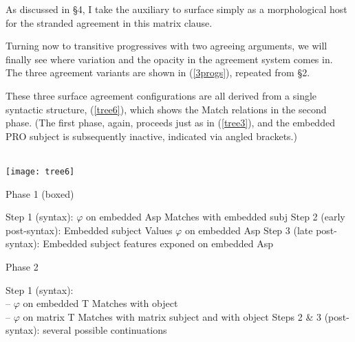 \documentclass[output=paper
,modfonts
,nonflat]{langsci/langscibook}
\begin{document}
\noindent As discussed in \S4, I take the auxiliary to surface simply as a morphological host for the stranded agreement in this matrix clause. 

Turning now to transitive progressives with two agreeing arguments, we will finally see where variation and the opacity in the agreement system comes in. The three agreement variants are shown in (\ref{3progs}), repeated from \S2. 

\eal \label{3progs}
\zl

These three surface agreement configurations are all derived from a single syntactic structure, (\ref{tree6}), which shows the Match relations in the second phase. (The first phase, again, proceeds just as in (\ref{tree3}), and the embedded PRO subject is subsequently inactive, indicated via angled brackets.) 

\ea \label{tree6} \- \\ \texttt{[image: tree6]}
\z

\eal \label{layoutincomp}
\ex Phase 1 (boxed)
\begin{xlist}
\ex Step 1 (syntax): $\varphi$ on embedded Asp Matches with embedded subj
\ex Step 2 (early post-syntax): Embedded subject Values $\varphi$ on embedded Asp
\ex Step 3 (late post-syntax): Embedded subject features exponed on embedded Asp
\end{xlist}
\ex Phase 2 \label{phase2}
\begin{xlist}
\ex Step 1 (syntax):\\-- $\varphi$ on embedded T Matches with object\\-- $\varphi$ on matrix T Matches with matrix subject and with object
\ex Steps 2 \& 3 (post-syntax): several possible continuations
\end{xlist}
\zl
\end{document}
